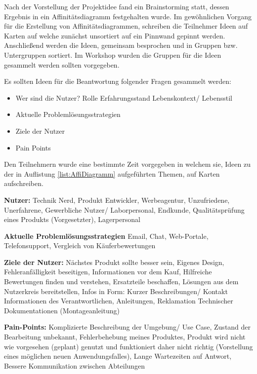 Nach der Vorstellung der Projektidee fand ein Brainstorming statt, dessen Ergebnis in ein Affinitätsdiagramm festgehalten wurde. 
Im gewöhnlichen Vorgang für die Erstellung von Affinitätsdiagrammen, schreiben die Teilnehmer Ideen auf Karten auf welche zunächst unsortiert auf ein Pinnwand gepinnt werden. 
Anschließend werden die Ideen, gemeinsam besprochen und in Gruppen bzw. Untergruppen sortiert. Im Workshop wurden die Gruppen für die Ideen gesammelt werden sollten vorgegeben.  

Es sollten Ideen für die Beantwortung folgender Fragen gesammelt werden: 

\begin{itemize}
	\item Wer sind die Nutzer?
		\subitem Rolle
		\subitem Erfahrungsstand
		\subitem Lebenskontext/ Lebensstil
	\item Aktuelle Problemlösungsstrategien	
	\item Ziele der Nutzer
	\item Pain Points
\end{itemize}\label{list:AffiDiagramm}

Den Teilnehmern wurde eine bestimmte Zeit vorgegeben in welchem sie, Ideen zu der in Auflistung \ref{list:AffiDiagramm} aufgeführten Themen, auf Karten aufschreiben.

\vspace{5mm}
\textbf{Nutzer: } 
Technik Nerd, Produkt Entwickler, Werbeagentur, Unzufriedene, Unerfahrene, Gewerbliche Nutzer/ Laborpersonal, Endkunde, Qualitätsprüfung eines Produkts (Vorgesetzter), Lagerpersonal

\vspace{5mm}
\textbf{Aktuelle Problemlösungsstrategien} 
Email, Chat, Web-Portale, Telefonsupport, Vergleich von Käuferbewertungen

\vspace{5mm}
\textbf{Ziele der Nutzer: } 
Nächstes Produkt sollte besser sein, Eigenes Design, Fehleranfälligkeit beseitigen, Informationen vor dem Kauf, Hilfreiche Bewertungen finden und verstehen, Ersatzteile beschaffen, Lösungen aus dem Nutzerkreis bereitstellen, Infos in Form: Kurzer Beschreibungen/ Kontakt Informationen des Verantwortlichen, Anleitungen, Reklamation Technischer Dokumentationen (Montageanleitung)

\vspace{5mm}
\textbf{Pain-Points: } 
Komplizierte Beschreibung der Umgebung/ Use Case, Zustand der Bearbeitung unbekannt, Fehlerbehebung meines Produktes, Produkt wird nicht wie vorgesehen (geplant) genutzt und funktioniert daher nicht richtig (Vorstellung eines möglichen neuen Anwendungsfalles), Lange Wartezeiten auf Antwort, Bessere Kommunikation zwischen Abteilungen


